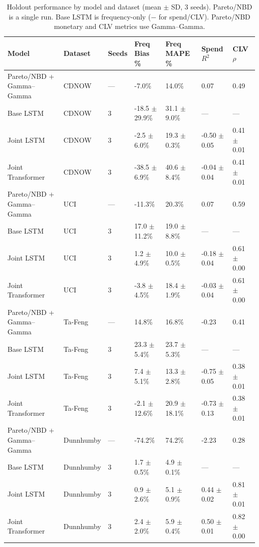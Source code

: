 \begin{table}
\centering
\small
\caption{Holdout performance by model and dataset (mean $\pm$ SD, 3 seeds). Pareto/NBD is a single run. Base LSTM is frequency-only ($-$ for spend/CLV). Pareto/NBD monetary and CLV metrics use Gamma--Gamma.}
\label{tab:headline_summary}
\begin{tabular}{lllllll}
\toprule
Model & Dataset & Seeds & Freq Bias \% & Freq MAPE \% & Spend $R^2$ & CLV $\rho$ \\
\midrule
Pareto/NBD + Gamma--Gamma & CDNOW & — & -7.0\% & 14.0\% & 0.07 & 0.49 \\
Base LSTM & CDNOW & 3 & -18.5 $\pm$ 29.9\% & 31.1 $\pm$ 9.0\% & — & — \\
Joint LSTM & CDNOW & 3 & -2.5 $\pm$ 6.0\% & 19.3 $\pm$ 0.3\% & -0.50 $\pm$ 0.05 & 0.41 $\pm$ 0.01 \\
Joint Transformer & CDNOW & 3 & -38.5 $\pm$ 6.9\% & 40.6 $\pm$ 8.4\% & -0.04 $\pm$ 0.04 & 0.41 $\pm$ 0.01 \\
Pareto/NBD + Gamma--Gamma & UCI & — & -11.3\% & 20.3\% & 0.07 & 0.59 \\
Base LSTM & UCI & 3 & 17.0 $\pm$ 11.2\% & 19.0 $\pm$ 8.8\% & — & — \\
Joint LSTM & UCI & 3 & 1.2 $\pm$ 4.9\% & 10.0 $\pm$ 0.5\% & -0.18 $\pm$ 0.04 & 0.61 $\pm$ 0.00 \\
Joint Transformer & UCI & 3 & -3.8 $\pm$ 4.5\% & 18.4 $\pm$ 1.9\% & -0.03 $\pm$ 0.04 & 0.61 $\pm$ 0.00 \\
Pareto/NBD + Gamma--Gamma & Ta-Feng & — & 14.8\% & 16.8\% & -0.23 & 0.41 \\
Base LSTM & Ta-Feng & 3 & 23.3 $\pm$ 5.4\% & 23.7 $\pm$ 5.3\% & — & — \\
Joint LSTM & Ta-Feng & 3 & 7.4 $\pm$ 5.1\% & 13.3 $\pm$ 2.8\% & -0.75 $\pm$ 0.05 & 0.38 $\pm$ 0.01 \\
Joint Transformer & Ta-Feng & 3 & -2.1 $\pm$ 12.6\% & 20.9 $\pm$ 18.1\% & -0.73 $\pm$ 0.13 & 0.38 $\pm$ 0.01 \\
Pareto/NBD + Gamma--Gamma & Dunnhumby & — & -74.2\% & 74.2\% & -2.23 & 0.28 \\
Base LSTM & Dunnhumby & 3 & 1.7 $\pm$ 0.5\% & 4.9 $\pm$ 0.1\% & — & — \\
Joint LSTM & Dunnhumby & 3 & 0.9 $\pm$ 2.6\% & 5.1 $\pm$ 0.9\% & 0.44 $\pm$ 0.02 & 0.81 $\pm$ 0.01 \\
Joint Transformer & Dunnhumby & 3 & 2.4 $\pm$ 2.0\% & 5.9 $\pm$ 0.4\% & 0.50 $\pm$ 0.01 & 0.82 $\pm$ 0.00 \\
\bottomrule
\end{tabular}
\end{table}
